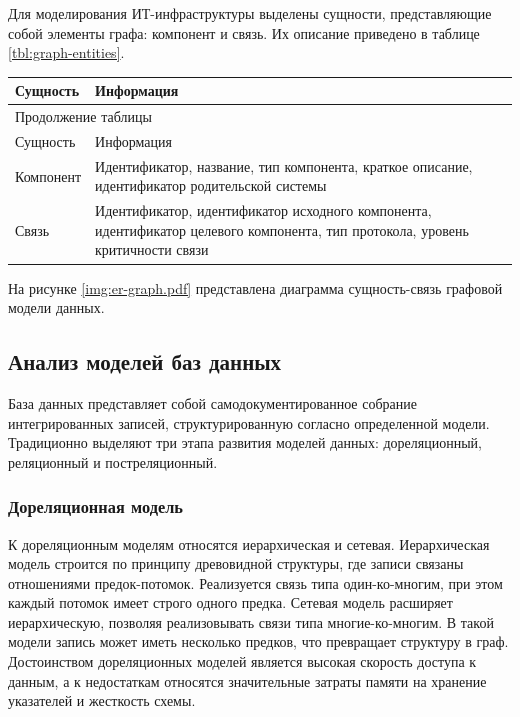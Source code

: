 Для моделирования ИТ-инфраструктуры выделены сущности, представляющие собой элементы
графа: компонент и связь. Их описание приведено в таблице \ref{tbl:graph-entities}.

\begin{center}
    \begin{tabularx}{\textwidth}{|X|X|}
        \caption{\label{tbl:graph-entities}Сущности топологии инфраструктуры} \\ \hline
        Сущность & Информация \\ \hline
        \endfirsthead

        \multicolumn{2}{l}{{Продолжение таблицы\ \thetable{}}} \\ \hline
        Сущность & Информация \\ \hline
        \endhead

        \endfoot
        \endlastfoot

        Компонент & Идентификатор, название, тип компонента, краткое описание, 
        идентификатор родительской системы \\ \hline

        Связь & Идентификатор, идентификатор исходного компонента, идентификатор целевого
        компонента, тип протокола, уровень критичности связи \\ \hline
    \end{tabularx}
\end{center}

На рисунке \ref{img:er-graph.pdf} представлена диаграмма сущность-связь графовой 
модели данных.


\subsection{Анализ моделей баз данных}
База данных представляет собой самодокументированное собрание интегрированных записей,
структурированную согласно определенной модели. Традиционно выделяют три этапа развития
моделей данных: дореляционный, реляционный и постреляционный.

\subsubsection{Дореляционная модель}
К дореляционным моделям относятся иерархическая и сетевая. Иерархическая модель строится
по принципу древовидной структуры, где записи связаны отношениями предок-потомок.
Реализуется связь типа один-ко-многим, при этом каждый потомок имеет строго одного
предка. Сетевая модель расширяет иерархическую, позволяя реализовывать связи типа
многие-ко-многим. В такой модели запись может иметь несколько предков, что превращает
структуру в граф. Достоинством дореляционных моделей является высокая скорость доступа к
данным, а к недостаткам относятся значительные затраты памяти на хранение указателей и
жесткость схемы.

